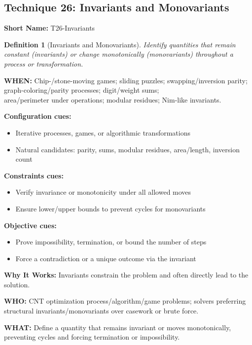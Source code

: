 \documentclass[12pt]{article}
\newtheorem{definition}{Definition}[section]
\begin{document}
\subsection{Technique 26: Invariants and Monovariants}
\textbf{Short Name:} T26-Invariants

\begin{definition}[Invariants and Monovariants]
Identify quantities that remain constant (invariants) or change monotonically (monovariants) throughout a process or transformation.
\end{definition}

\textbf{WHEN:} Chip-/stone-moving games; sliding puzzles; swapping/inversion parity; graph-coloring/parity processes; digit/weight sums;\\ area/perimeter under operations; modular residues; Nim-like invariants.

\textbf{Configuration cues:}
\begin{itemize}
    \item Iterative processes, games, or algorithmic transformations
    \item Natural candidates: parity, sums, modular residues, area/length, inversion count
\end{itemize}

\textbf{Constraints cues:}
\begin{itemize}
    \item Verify invariance or monotonicity under all allowed moves
    \item Ensure lower/upper bounds to prevent cycles for monovariants
\end{itemize}

\textbf{Objective cues:}
\begin{itemize}
    \item Prove impossibility, termination, or bound the number of steps
    \item Force a contradiction or a unique outcome via the invariant
\end{itemize}

\textbf{Why It Works:} Invariants constrain the problem and often directly lead to the solution.

\textbf{WHO:} CNT optimization process/algorithm/game problems; solvers preferring structural invariants/monovariants over casework or brute force.

\textbf{WHAT:} Define a quantity that remains invariant or moves monotonically, preventing cycles and forcing termination or impossibility.
\end{document}
